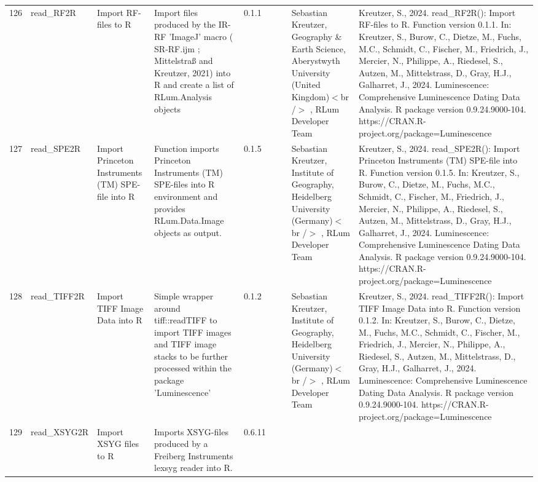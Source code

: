 \begin{table}[ht]
\begin{tabular}{rllllllll}
 \\ 
  126 & read\_RF2R & Import RF-files to R & Import files produced by the IR-RF 'ImageJ' macro ( SR-RF.ijm ; Mittelstraß and Kreutzer, 2021) into R and create a list of  RLum.Analysis  objects & 0.1.1
 &  &  & Sebastian Kreutzer, Geography \& Earth Science, Aberystwyth University (United Kingdom)$<$br /$>$ , RLum Developer Team & Kreutzer, S., 2024. read\_RF2R(): Import RF-files to R. Function version 0.1.1. In: Kreutzer, S., Burow, C., Dietze, M., Fuchs, M.C., Schmidt, C., Fischer, M., Friedrich, J., Mercier, N., Philippe, A., Riedesel, S., Autzen, M., Mittelstrass, D., Gray, H.J., Galharret, J., 2024. Luminescence: Comprehensive Luminescence Dating Data Analysis. R package version 0.9.24.9000-104. https://CRAN.R-project.org/package=Luminescence
 \\ 
  127 & read\_SPE2R & Import Princeton Instruments (TM) SPE-file into R & Function imports Princeton Instruments (TM) SPE-files into R environment and provides  RLum.Data.Image  objects as output. & 0.1.5
 &  &  & Sebastian Kreutzer, Institute of Geography, Heidelberg University (Germany)$<$br /$>$ , RLum Developer Team & Kreutzer, S., 2024. read\_SPE2R(): Import Princeton Instruments (TM) SPE-file into R. Function version 0.1.5. In: Kreutzer, S., Burow, C., Dietze, M., Fuchs, M.C., Schmidt, C., Fischer, M., Friedrich, J., Mercier, N., Philippe, A., Riedesel, S., Autzen, M., Mittelstrass, D., Gray, H.J., Galharret, J., 2024. Luminescence: Comprehensive Luminescence Dating Data Analysis. R package version 0.9.24.9000-104. https://CRAN.R-project.org/package=Luminescence
 \\ 
  128 & read\_TIFF2R & Import TIFF Image Data into R & Simple wrapper around  tiff::readTIFF  to import TIFF images and TIFF image stacks to be further processed within the package  'Luminescence' & 0.1.2
 &  &  & Sebastian Kreutzer, Institute of Geography, Heidelberg University (Germany)$<$br /$>$ , RLum Developer Team & Kreutzer, S., 2024. read\_TIFF2R(): Import TIFF Image Data into R. Function version 0.1.2. In: Kreutzer, S., Burow, C., Dietze, M., Fuchs, M.C., Schmidt, C., Fischer, M., Friedrich, J., Mercier, N., Philippe, A., Riedesel, S., Autzen, M., Mittelstrass, D., Gray, H.J., Galharret, J., 2024. Luminescence: Comprehensive Luminescence Dating Data Analysis. R package version 0.9.24.9000-104. https://CRAN.R-project.org/package=Luminescence
 \\ 
  129 & read\_XSYG2R & Import XSYG files to R & Imports XSYG-files produced by a Freiberg Instruments lexsyg reader into R. & 0.6.11

\end{tabular}
\end{table}
